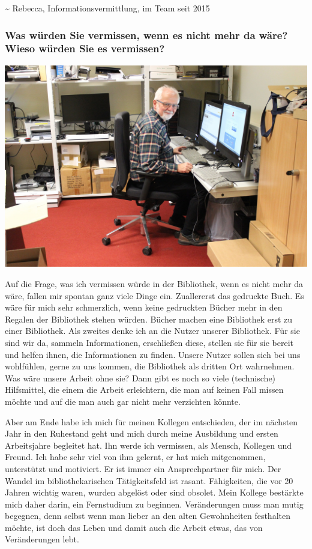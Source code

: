 \textasciitilde{} Rebecca, Informationsvermittlung, im Team seit 2015

\hypertarget{was-wuxfcrden-sie-vermissen-wenn-es-nicht-mehr-da-wuxe4re-wieso-wuxfcrden-sie-es-vermissen}{%
\subsubsection{Was würden Sie vermissen, wenn es nicht mehr da wäre? Wieso
würden Sie es
vermissen?}\label{was-wuxfcrden-sie-vermissen-wenn-es-nicht-mehr-da-wuxe4re-wieso-wuxfcrden-sie-es-vermissen}}

\begin{center}
\includegraphics{htw-dresden/img/Rainer.jpg}
\end{center}

Auf die Frage, was ich vermissen würde in der Bibliothek, wenn es nicht
mehr da wäre, fallen mir spontan ganz viele Dinge ein. Zuallererst das
gedruckte Buch. Es wäre für mich sehr schmerzlich, wenn keine gedruckten
Bücher mehr in den Regalen der Bibliothek stehen würden. Bücher machen
eine Bibliothek erst zu einer Bibliothek. Als zweites denke ich an die
Nutzer unserer Bibliothek. Für sie sind wir da, sammeln Informationen,
erschließen diese, stellen sie für sie bereit und helfen ihnen, die
Informationen zu finden. Unsere Nutzer sollen sich bei uns wohlfühlen,
gerne zu uns kommen, die Bibliothek als dritten Ort wahrnehmen. Was wäre
unsere Arbeit ohne sie? Dann gibt es noch so viele (technische)
Hilfsmittel, die einem die Arbeit erleichtern, die man auf keinen Fall
missen möchte und auf die man auch gar nicht mehr verzichten könnte.

Aber am Ende habe ich mich für meinen Kollegen entschieden, der im
nächsten Jahr in den Ruhestand geht und mich durch meine Ausbildung und
ersten Arbeitsjahre begleitet hat. Ihn werde ich vermissen, als Mensch,
Kollegen und Freund. Ich habe sehr viel von ihm gelernt, er hat mich
mitgenommen, unterstützt und motiviert. Er ist immer ein Ansprechpartner
für mich. Der Wandel im bibliothekarischen Tätigkeitsfeld ist rasant.
Fähigkeiten, die vor 20 Jahren wichtig waren, wurden abgelöst oder sind
obsolet. Mein Kollege bestärkte mich daher darin, ein Fernstudium zu
beginnen. Veränderungen muss man mutig begegnen, denn selbst wenn man
lieber an den alten Gewohnheiten festhalten möchte, ist doch das Leben
und damit auch die Arbeit etwas, das von Veränderungen lebt.


